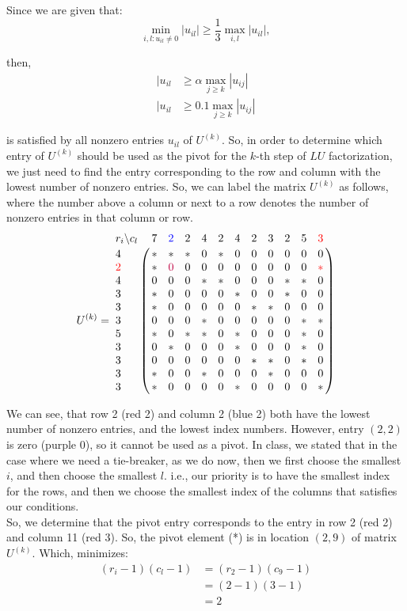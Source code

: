 \documentclass[12pt]{article}
\let\bbordermatrix\bordermatrix
\begin{document}
\begin{itemize}
Since we are given that:
$$\min_{i,l: u_{il}\neq 0} |u_{il}| \geq \frac{1}{3} \max_{i,l} |u_{il}|,$$

then,
\begin{align}
|u_{il} &\geq \alpha \max_{j \geq k} |u_{ij}| \nonumber \\
|u_{il} &\geq 0.1 \max_{j \geq k} |u_{ij}| \nonumber
\end{align}

is satisfied by all nonzero entries $u_{il}$ of $U^{(k)}$.  So, in order to  determine which entry of $U^{(k)}$ should be used as the pivot for the $k$-th step of $LU$ factorization, we just need to find the entry corresponding to the row and column with the lowest number of nonzero entries.  So, we can label the matrix $U^{(k)}$ as follows, where the number above a column or next to a row denotes the number of nonzero entries in that column or row.\\
$$U^{(k)} = \bbordermatrix{
r_i\backslash c_l & 7 & \color{blue} 2 & 2 & 4 & 2 & 4 & 2 & 3 & 2 & 5 & \color{red} 3 \cr
4 & * & * & * & 0 & * & 0 & 0 & 0 & 0 & 0 & 0 \cr
\color{red} 2 & * & \color{purple} 0 & 0 & 0 & 0 & 0 & 0 & 0 & 0 & 0 & \color{red}* \cr
4 & 0 & 0 & 0 & * & * & 0 & 0 & 0 & * & * & 0 \cr
3 & * & 0 & 0 & 0 & 0 & * & 0 & 0 & * & 0 & 0 \cr
3 & * & 0 & 0 & 0 & 0 & 0 & * & * & 0 & 0 & 0 \cr
3 & 0 & 0 & 0 & * & 0 & 0 & 0 & 0 & 0 & * & * \cr
5 & * & 0 & * & * & 0 & * & 0 & 0 & 0 & * & 0 \cr
3 & 0 & * & 0 & 0 & 0 & * & 0 & 0 & 0 & * & 0 \cr
3 & 0 & 0 & 0 & 0 & 0 & 0 & * & * & 0 & * & 0 \cr
3 & * & 0 & 0 & * & 0 & 0 & 0 & * & 0 & 0 & 0 \cr
3 & * & 0 & 0 & 0 & 0 & * & 0 & 0 & 0 & 0 & * \cr}$$


We can see, that row 2 ({\color{red}red 2}) and column 2 ({\color{blue}blue 2}) both have the lowest number of nonzero entries, and the lowest index numbers.  However, entry $(2,2)$ is zero ({\color{purple}purple 0}), so it cannot be used as a pivot.  In class, we stated that in the case where we need a tie-breaker, as we do now, then we first choose the smallest $i$, and then choose the smallest $l$.  i.e., our priority is to have the smallest index for the rows, and then we choose the smallest index of the columns that satisfies our conditions.\\

So, we determine that the pivot entry corresponds to the entry in row 2 ({\color{red}red 2}) and column 11 ({\color{red}red 3}).  So, the pivot element ({\color{red}*}) is in location $(2,9)$ of matrix $U^{(k)}$.  Which, minimizes:
\begin{align}
(r_i - 1)(c_l - 1) &= (r_2 - 1)(c_9 - 1) \nonumber \\
&= (2 - 1)(3 - 1) \nonumber \\
&= 2 \nonumber
\end{align}


\end{itemize}
\end{document}

